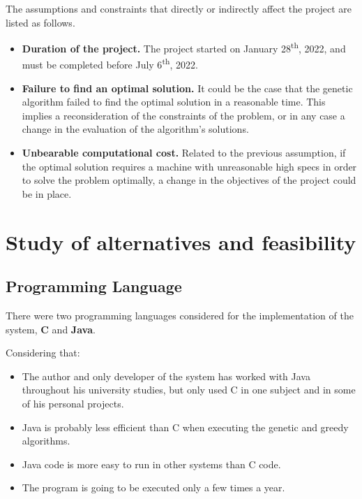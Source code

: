 The assumptions and constraints that directly or indirectly affect the project are listed as follows.

\begin{itemize}
    \item \textbf{Duration of the project.} The project started on January 28\textsuperscript{th}, 2022, and must be completed before July 6\textsuperscript{th}, 2022. 
    \item \textbf{Failure to find an optimal solution.} It could be the case that the genetic algorithm failed to find the optimal solution in a reasonable time. This implies a reconsideration of the constraints of the problem, or in any case a change in the evaluation of the algorithm's solutions.
    \item \textbf{Unbearable computational cost.} Related to the previous assumption, if the optimal solution requires a machine with unreasonable high specs in order to solve the problem optimally, a change in the objectives of the project could be in place.
\end{itemize}

\section{Study of alternatives and feasibility}

\subsection{Programming Language}

There were two programming languages considered for the implementation of the system, \textbf{C} and \textbf{Java}.

Considering that:

\begin{itemize}
    \item The author and only developer of the system has worked with Java throughout his university studies, but only used C in one subject and in some of his personal projects.

    \item Java is probably less efficient than C when executing the genetic and greedy algorithms.

    \item Java code is more easy to run in other systems than C code.

    \item The program is going to be executed only a few times a year.
\end{itemize}

